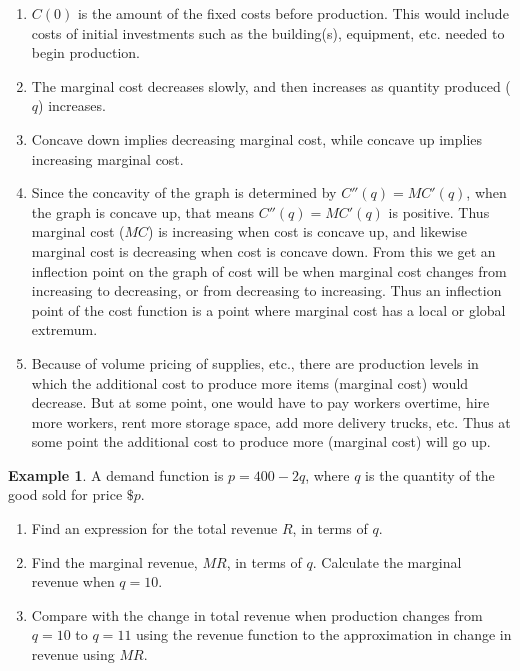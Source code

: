 \documentclass[oneside]{book}
\theoremstyle{definition}
\newtheorem{example}{Example}
\theoremstyle{solution}
\newtheorem*{solution}{Solution}
\newenvironment{solution}{\vspace{2in}\comment}{\endcomment}
\begin{document}
\begin{solution}
  \begin{enumerate}
  \item $C(0)$ is the amount of the fixed costs before
    production. This would include costs of initial investments such
    as the building(s), equipment, etc. needed to begin production.
  \item The marginal cost decreases slowly, and then increases as
    quantity produced ($q$) increases.
  \item Concave down implies decreasing marginal cost, while concave
    up implies increasing marginal cost.
  \item Since the concavity of the graph is determined by
    $C''(q) = MC'(q)$, when the graph is concave up, that means
    $C''(q) = MC'(q)$ is positive.  Thus marginal cost ($MC$) is
    increasing when cost is concave up, and likewise marginal cost is
    decreasing when cost is concave down.  From this we get an
    inflection point on the graph of cost will be when marginal cost
    changes from increasing to decreasing, or from decreasing to
    increasing.  Thus an inflection point of the cost function is a
    point where marginal cost has a local or global extremum.
  \item Because of volume pricing of supplies, etc., there are
    production levels in which the additional cost to produce more
    items (marginal cost) would decrease. But at some point, one would
    have to pay workers overtime, hire more workers, rent more storage
    space, add more delivery trucks, etc.  Thus at some point the
    additional cost to produce more (marginal cost) will go up.
  \end{enumerate}
\end{solution}
  
\begin{example}
  A demand function is $p = 400-2q$, where $q$ is the quantity of the
  good sold for price $\$p$.
\begin{enumerate}
\item Find an expression for the total revenue $R$, in terms of $q$.
\item Find the marginal revenue, $MR$, in terms of $q$. Calculate the
  marginal revenue when $q=10$.
\item Compare with the change in total revenue when production changes
  from $q=10$ to $q=11$ using the revenue function to the
  approximation in change in revenue using $MR$.
\end{enumerate}
\end{example}
\end{document}
